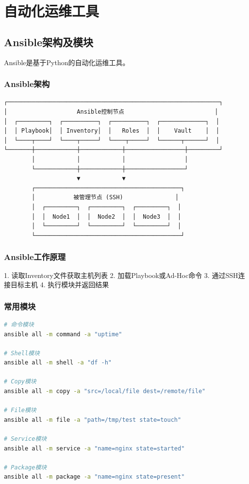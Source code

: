 \documentclass[12pt,UTF8]{ctexbook}
\begin{document}
\chapter{自动化运维工具}
\label{chap:automation-tools}

\section{Ansible架构及模块}
\label{sec:ansible-architecture}

Ansible是基于Python的自动化运维工具。

\subsection*{Ansible架构}
\begin{lstlisting}
┌─────────────────────────────────────────────────────────────┐
│                    Ansible控制节点                          │
│  ┌─────────┐  ┌──────────┐  ┌──────────┐  ┌─────────────┐  │
│  │ Playbook│  │ Inventory│  │   Roles  │  │    Vault    │  │
│  └────┬────┘  └────┬─────┘  └────┬─────┘  └──────┬──────┘  │
└───────┼────────────┼────────────┼─────────────────┼─────────┘
        │            │            │                 │
        └────────────┼────────────┼─────────────────┘
                     ▼            ▼
        ┌──────────────────────────────────────────┐
        │           被管理节点 (SSH)               │
        │  ┌─────────┐  ┌─────────┐  ┌─────────┐  │
        │  │  Node1  │  │  Node2  │  │  Node3  │  │
        │  └─────────┘  └─────────┘  └─────────┘  │
        └──────────────────────────────────────────┘
\end{lstlisting}

\subsection*{Ansible工作原理}
1. 读取Inventory文件获取主机列表
2. 加载Playbook或Ad-Hoc命令
3. 通过SSH连接目标主机
4. 执行模块并返回结果

\subsection*{常用模块}
\begin{lstlisting}[language=bash]
# 命令模块
ansible all -m command -a "uptime"

# Shell模块
ansible all -m shell -a "df -h"

# Copy模块
ansible all -m copy -a "src=/local/file dest=/remote/file"

# File模块
ansible all -m file -a "path=/tmp/test state=touch"

# Service模块
ansible all -m service -a "name=nginx state=started"

# Package模块
ansible all -m package -a "name=nginx state=present"
\end{lstlisting}
\end{document}
